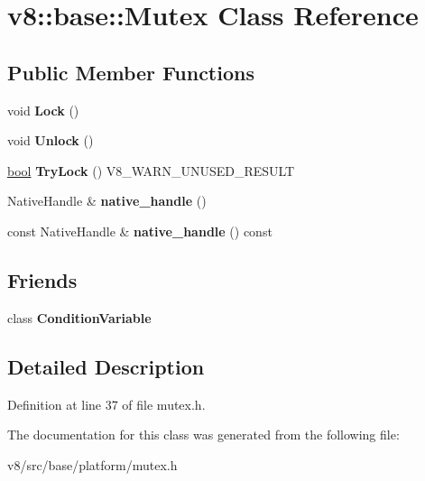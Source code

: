 \hypertarget{classv8_1_1base_1_1Mutex}{}\section{v8\+:\+:base\+:\+:Mutex Class Reference}
\label{classv8_1_1base_1_1Mutex}
\subsection*{Public Member Functions}
\begin{DoxyCompactItemize}
\item 
\mbox{\label{classv8_1_1base_1_1Mutex_ad2dc6441de065f9f5c964a90ecf93f71}} 
void {\bfseries Lock} ()
\item 
\mbox{\label{classv8_1_1base_1_1Mutex_a0289de89a03aa2eea24982385cdbc62c}} 
void {\bfseries Unlock} ()
\item 
\mbox{\label{classv8_1_1base_1_1Mutex_a10d761f0e177ba88dd2810cf296d15de}} 
\mbox{\hyperlink{classbool}{bool}} {\bfseries Try\+Lock} () V8\+\_\+\+W\+A\+R\+N\+\_\+\+U\+N\+U\+S\+E\+D\+\_\+\+R\+E\+S\+U\+LT
\item 
\mbox{\label{classv8_1_1base_1_1Mutex_ae8448aa4f9a939528a856c7c8bcbd6fa}} 
Native\+Handle \& {\bfseries native\+\_\+handle} ()
\item 
\mbox{\label{classv8_1_1base_1_1Mutex_a971f02a76cbae8e7275d73554d4577fc}} 
const Native\+Handle \& {\bfseries native\+\_\+handle} () const
\end{DoxyCompactItemize}
\subsection*{Friends}
\begin{DoxyCompactItemize}
\item 
\mbox{\label{classv8_1_1base_1_1Mutex_ab270e49e575fdf0fe1a4f2ee911df116}} 
class {\bfseries Condition\+Variable}
\end{DoxyCompactItemize}


\subsection{Detailed Description}


Definition at line 37 of file mutex.\+h.



The documentation for this class was generated from the following file\+:\begin{DoxyCompactItemize}
\item 
v8/src/base/platform/mutex.\+h\end{DoxyCompactItemize}
